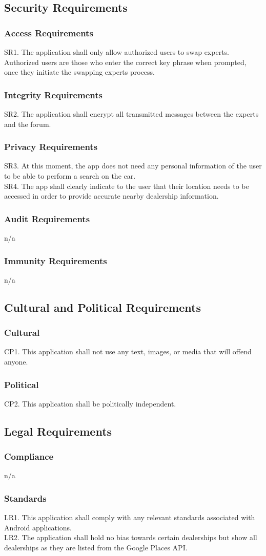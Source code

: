 \documentclass[12pt]{article}
\begin{document}
\subsection{Security Requirements}
\subsubsection{Access Requirements}
SR1. The application shall only allow authorized users to swap experts. Authorized users are those who enter the correct key phrase when prompted, once they initiate the swapping experts process.
\subsubsection{Integrity Requirements}
SR2. The application shall encrypt all transmitted messages between the experts and the forum.
\subsubsection{Privacy Requirements}
SR3. At this moment, the app does not need any personal information of the user to be able to perform a search on the car.\\
SR4. The app shall clearly indicate to the user that their location needs to be accessed in order to provide accurate nearby dealership information.
\subsubsection{Audit Requirements}
n/a
\subsubsection{Immunity Requirements}
n/a
\subsection{Cultural and Political Requirements}
\subsubsection{Cultural}
CP1. This application shall not use any text, images, or media that will offend anyone.
\subsubsection{Political}
CP2. This application shall be politically independent.
\subsection{Legal Requirements}
\subsubsection{Compliance}
n/a
\subsubsection{Standards}
LR1. This application shall comply with any relevant standards associated with Android applications.\\
LR2. The application shall hold no bias towards certain dealerships but show all dealerships as they are listed from the Google Places API.
\end{document}
